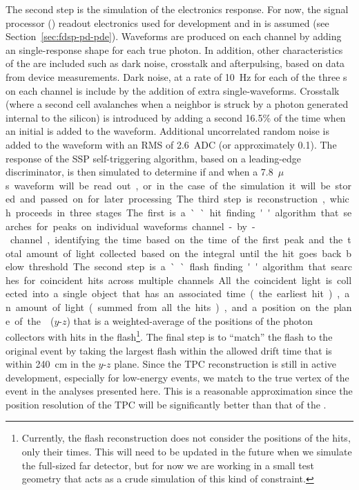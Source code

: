 The second step is the simulation of the electronics response. For now, the  signal processor () readout electronics used for  development and in  is assumed (see Section~\ref{sec:fdsp-pd-pde}). 
Waveforms are produced on each channel by adding an  single-\phel response shape for each true photon. In addition, other characteristics of the  are included such as dark noise, crosstalk and afterpulsing, based on data from device measurements. 
Dark noise, at a rate of \SI{10}{Hz} for each of the three s on each channel is include by the addition of extra single-\phel waveforms. Crosstalk (where a second cell avalanches when a neighbor is struck by a photon generated internal to the silicon) is introduced by adding a second \phel \num{16.5}\% of the time when an initial \phel is added to the waveform. Additional uncorrelated random noise is added to the waveform with an RMS of \SI{2.6}{ADC} (or approximately \SI{0.1}{\phel}). The response of the SSP self-triggering algorithm, based on a leading-edge discriminator, is then simulated to determine if and when a \SI{7.8}{$\mu$s} waveform will be read out, or in the case of the simulation it will be stored and passed on for later processing.

The third step is reconstruction, which proceeds in three stages. The first is a ``hit finding'' algorithm that searches for peaks on individual waveforms channel-by-channel, identifying the time based on the time of the first peak and the total amount of light collected based on the integral until the hit goes back below threshold. The second step is a ``flash finding'' algorithm that searches for coincident hits across multiple channels. All the coincident light is collected into a single object that has an associated time (the earliest hit), an amount of light (summed from all the hits), and a position on the plane of the  ($y$-$z$) that is a weighted-average of the positions of the photon collectors with hits in the flash\footnote{Currently, the flash reconstruction does not consider the positions of the hits, only their times. 
This will need to be updated in the future when we simulate the full-sized far detector,  but for now we are working in a small test geometry that acts as a crude simulation of this kind of constraint.}. The final step is to ``match'' the flash to the original event by taking the largest flash within the allowed drift time that is within \SI{240}{cm} in the $y$-$z$ plane. Since the TPC reconstruction is still in active development, especially for low-energy events, we match to the true  vertex of the event in the analyses presented here. This is a reasonable approximation since the position resolution of the TPC will be significantly better than that of the . 

